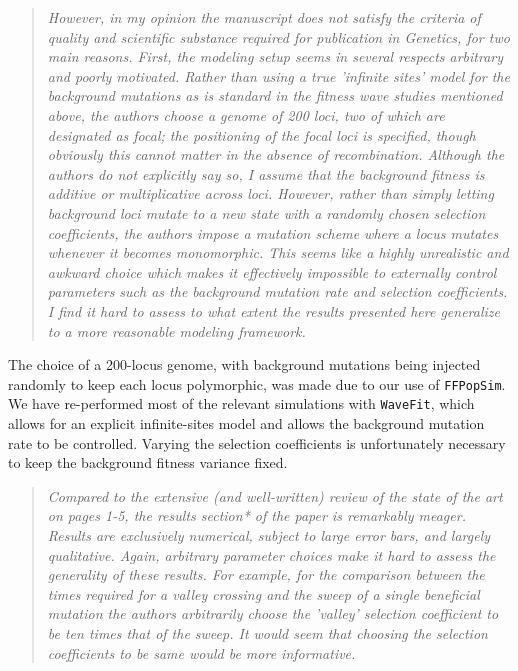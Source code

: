 \documentclass[11pt]{article}
\newenvironment{reviewerquote}{\begin{quote}\color{black}\itshape}{\end{quote}}
\begin{document}
\begin{reviewerquote}
However, in my opinion the manuscript does not satisfy the criteria of quality and scientific substance required for publication in Genetics, for two main reasons. First, the modeling setup seems in several respects arbitrary and poorly motivated. Rather than using a true 'infinite sites' model for the background mutations as is standard in the fitness wave studies mentioned above, the authors choose a genome of 200 loci, two of which are designated as focal; the positioning of the focal loci is specified, though obviously this cannot matter in the absence of recombination. Although the authors do not explicitly say so, I assume that the background fitness is additive or multiplicative across loci. However, rather than simply letting background loci mutate to a new state with a randomly chosen selection coefficients, the authors impose a mutation scheme where a locus mutates whenever it becomes monomorphic. This seems like a highly unrealistic and awkward choice which makes it effectively impossible to externally control parameters such as the background mutation rate and selection coefficients. I find it hard to assess to what extent the results presented here generalize to a more reasonable modeling framework. 
\end{reviewerquote}

The choice of a 200-locus genome, with background mutations being injected randomly to keep each locus polymorphic, was made due to our use of \texttt{FFPopSim}. We have re-performed most of the relevant simulations with \texttt{WaveFit}, which allows for an explicit infinite-sites model and allows the background mutation rate to be controlled. Varying the selection coefficients is unfortunately necessary to keep the background fitness variance fixed.

\begin{reviewerquote}
Compared to the extensive (and well-written) review of the state of the art on pages 1-5, the results section* of the paper is remarkably meager. Results are exclusively numerical, subject to large error bars, and largely qualitative. Again, arbitrary parameter choices make it hard to assess the generality of these results. For example, for the comparison between the times required for a valley 
crossing and the sweep of a single beneficial mutation the authors arbitrarily choose the 'valley' selection coefficient to be ten times that of the sweep. It would seem that choosing the selection coefficients to be same would be more informative.
\end{reviewerquote}
\end{document}
